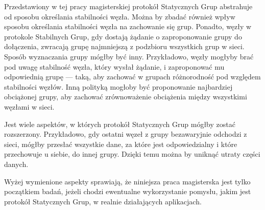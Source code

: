 \documentclass[12pt, twoside, openany]{report}
\begin{document}
Przedstawiony w tej pracy magisterskiej protokół Statycznych Grup abstrahuje od sposobu określania stabilności węzła. Można by zbadać również wpływ sposobu określania stabilności węzła na zachowanie się grup. Ponadto, węzły w protokole Stabilnych Grup, gdy dostają żądanie o zaproponowanie grupy do dołączenia, zwracają grupę najmniejszą z podzbioru wszystkich grup w sieci. Sposób wyznaczania grupy mógłby być inny. Przykładowo, węzły mogłyby brać pod uwagę stabilność węzła, który wysłał żądanie, i zaproponować mu odpowiednią grupę --- taką, aby zachować w grupach różnorodność pod względem stabilności węzłów. Inną polityką mogłoby być proponowanie najbardziej obciążonej grupy, aby zachować zrównoważenie obciążenia między wszystkimi węzłami w sieci.

Jest wiele aspektów, w których protokół Statycznych Grup mógłby zostać rozszerzony. Przykładowo, gdy ostatni węzeł z grupy bezawaryjnie odchodzi z sieci, mógłby przesłać wszystkie dane, za które jest odpowiedzialny i które przechowuje u siebie, do innej grupy. Dzięki temu można by uniknąć utraty części danych.

Wyżej wymienione aspekty sprawiają, że niniejsza praca magisterska jest tylko początkiem badań, jeżeli chodzi ewentualne wykorzystanie pomysłu, jakim jest protokół Statycznych Grup, w realnie działających aplikacjach.



\end{document}
